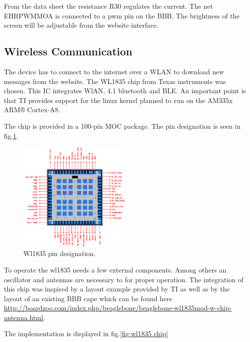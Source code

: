 From the data sheet the resistance R30 regulates the current. The net EHRPWMMOA is connected to a pwm pin on the BBB. The brightness of the screen will be adjustable from the website interface.


\subsection{Wireless Communication}
\label{chap:wireless com}
The device has to connect to the internet over a WLAN to download new messages from the website. The WL1835 chip from Texas instruments was chosen. This IC integrates WlAN, 4.1 bluetooth and BLE. An important point is that TI provides support for the linux kernel planned to run on the AM335x ARM® Cortex-A8.

The chip is provided in a 100-pin MOC package. The pin designation is seen in fig.\ref{fig:wl1835 pin designation}.

\begin{figure}[!htb]
    \centering
    \includegraphics[width=0.5\textwidth,keepaspectratio]{chap/hardFig/100_pin_MOC_wl1835_package}
    \caption{Wl1835 pin designation.}
    \label{fig:wl1835 pin designation}
\end{figure}

To operate the wl1835 needs a few external components. Among others an oscillator and antennas are necessary to for proper operation.
The integration of this chip was inspired by a layout example provided by TI as well as by the layout of an existing BBB cape which can be found here \url{http://boardzoo.com/index.php/beaglebone/beaglebone-wl1835mod-w-chip-antenna.html}.

The implementation is displayed in fig.\ref{fig:wl1835 chip}



